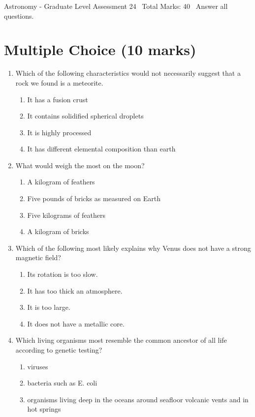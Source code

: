 \documentclass[12pt]{article}
\begin{document}
\begin{center}
Astronomy - Graduate Level Assessment 24 \
Total Marks: 40 \
Answer all questions.
\end{center}

\section*{Multiple Choice (10 marks)}
\begin{enumerate}[label=\arabic*.]
\item Which of the following characteristics would not necessarily suggest that a rock we found is a meteorite.
\begin{enumerate}[label=(\alph*)]
    \item It has a fusion crust
    \item It contains solidified spherical droplets
    \item It is highly processed
    \item It has different elemental composition than earth
\end{enumerate}
\item What would weigh the most on the moon?
\begin{enumerate}[label=(\alph*)]
    \item A kilogram of feathers
    \item Five pounds of bricks as measured on Earth
    \item Five kilograms of feathers
    \item A kilogram of bricks
\end{enumerate}
\item Which of the following most likely explains why Venus does not have a strong magnetic field?
\begin{enumerate}[label=(\alph*)]
    \item Its rotation is too slow.
    \item It has too thick an atmosphere.
    \item It is too large.
    \item It does not have a metallic core.
\end{enumerate}
\item Which living organisms most resemble the common ancestor of all life according to genetic testing?
\begin{enumerate}[label=(\alph*)]
    \item viruses
    \item bacteria such as E. coli
    \item organisms living deep in the oceans around seafloor volcanic vents and in hot springs

\end{enumerate}
\end{enumerate}
\end{document}
